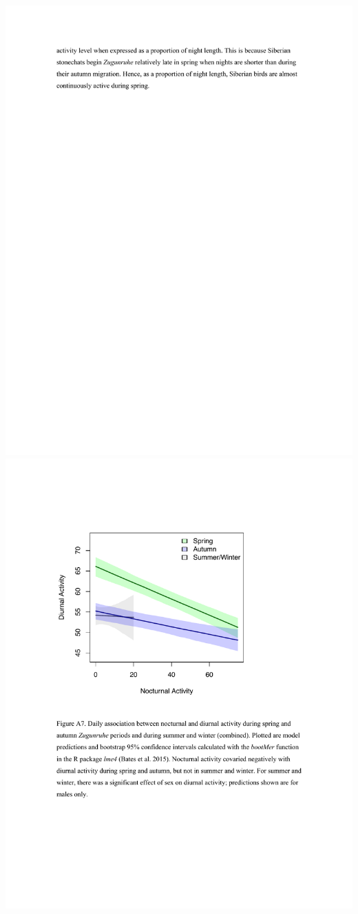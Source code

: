 \documentclass[a4paper, twoside]{templates/ociamthesis}
\begin{document}
\includegraphics[width=1\linewidth]{pdf_chapters/zug/zug_supp_crop_Part18}
\includegraphics[width=1\linewidth]{pdf_chapters/zug/zug_supp_crop_Part19}
\end{document}
